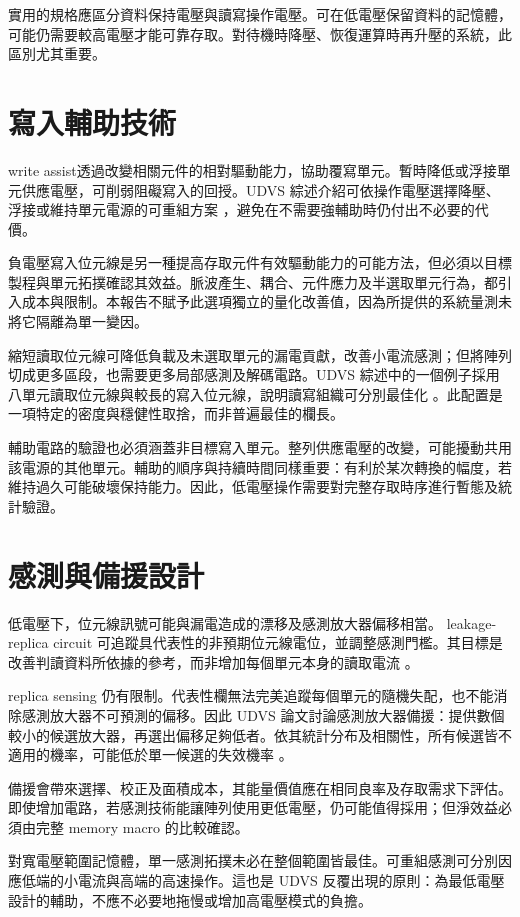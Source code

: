 實用的規格應區分資料保持電壓與讀寫操作電壓。可在低電壓保留資料的記憶體，可能仍需要較高電壓才能可靠存取。對待機時降壓、恢復運算時再升壓的系統，此區別尤其重要。

\section{寫入輔助技術}
 write assist透過改變相關元件的相對驅動能力，協助覆寫單元。暫時降低或浮接單元供應電壓，可削弱阻礙寫入的回授。UDVS 綜述介紹可依操作電壓選擇降壓、浮接或維持單元電源的可重組方案 \cite[Sec.~III-B]{udvs2010}，避免在不需要強輔助時仍付出不必要的代價。

負電壓寫入位元線是另一種提高存取元件有效驅動能力的可能方法，但必須以目標製程與單元拓撲確認其效益。脈波產生、耦合、元件應力及半選取單元行為，都引入成本與限制。本報告不賦予此選項獨立的量化改善值，因為所提供的系統量測未將它隔離為單一變因。

縮短讀取位元線可降低負載及未選取單元的漏電貢獻，改善小電流感測；但將陣列切成更多區段，也需要更多局部感測及解碼電路。UDVS 綜述中的一個例子採用八單元讀取位元線與較長的寫入位元線，說明讀寫組織可分別最佳化 \cite{udvs2010}。此配置是一項特定的密度與穩健性取捨，而非普遍最佳的欄長。

輔助電路的驗證也必須涵蓋非目標寫入單元。整列供應電壓的改變，可能擾動共用該電源的其他單元。輔助的順序與持續時間同樣重要：有利於某次轉換的幅度，若維持過久可能破壞保持能力。因此，低電壓操作需要對完整存取時序進行暫態及統計驗證。

\section{感測與備援設計}
低電壓下，位元線訊號可能與漏電造成的漂移及感測放大器偏移相當。 leakage-replica circuit 可追蹤具代表性的非預期位元線電位，並調整感測門檻。其目標是改善判讀資料所依據的參考，而非增加每個單元本身的讀取電流 \cite[Sec.~III-A]{udvs2010}。

 replica sensing 仍有限制。代表性欄無法完美追蹤每個單元的隨機失配，也不能消除感測放大器不可預測的偏移。因此 UDVS 論文討論感測放大器備援：提供數個較小的候選放大器，再選出偏移足夠低者。依其統計分布及相關性，所有候選皆不適用的機率，可能低於單一候選的失效機率 \cite{udvs2010}。

備援會帶來選擇、校正及面積成本，其能量價值應在相同良率及存取需求下評估。即使增加電路，若感測技術能讓陣列使用更低電壓，仍可能值得採用；但淨效益必須由完整 memory macro 的比較確認。

對寬電壓範圍記憶體，單一感測拓撲未必在整個範圍皆最佳。可重組感測可分別因應低端的小電流與高端的高速操作。這也是 UDVS 反覆出現的原則：為最低電壓設計的輔助，不應不必要地拖慢或增加高電壓模式的負擔。

